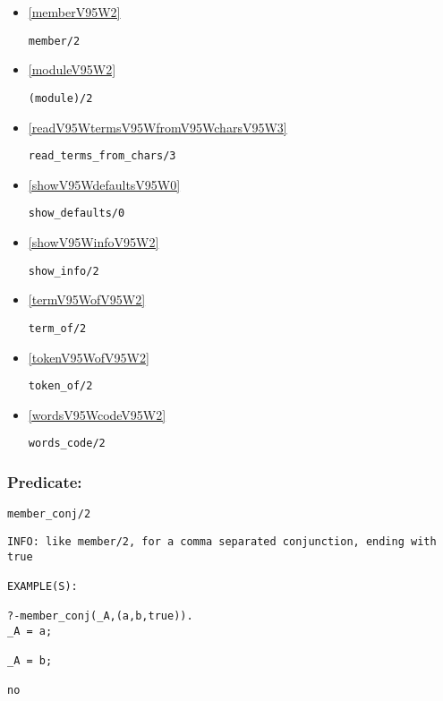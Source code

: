 \begin{itemize}
\item \ref{memberV95W2} 
\begin{verbatim}
member/2
\end{verbatim}

\item \ref{moduleV95W2} 
\begin{verbatim}
(module)/2
\end{verbatim}

\item \ref{readV95WtermsV95WfromV95WcharsV95W3} 
\begin{verbatim}
read_terms_from_chars/3
\end{verbatim}

\item \ref{showV95WdefaultsV95W0} 
\begin{verbatim}
show_defaults/0
\end{verbatim}

\item \ref{showV95WinfoV95W2} 
\begin{verbatim}
show_info/2
\end{verbatim}

\item \ref{termV95WofV95W2} 
\begin{verbatim}
term_of/2
\end{verbatim}

\item \ref{tokenV95WofV95W2} 
\begin{verbatim}
token_of/2
\end{verbatim}

\item \ref{wordsV95WcodeV95W2} 
\begin{verbatim}
words_code/2
\end{verbatim}

\end{itemize}

\subsubsection{Predicate:} \label{memberV95WconjV95W2}

\begin{verbatim}
member_conj/2
\end{verbatim}

{\small \begin{verbatim}
INFO: like member/2, for a comma separated conjunction, ending with true

EXAMPLE(S):

?-member_conj(_A,(a,b,true)).
_A = a;

_A = b;

no

\end{verbatim}}
